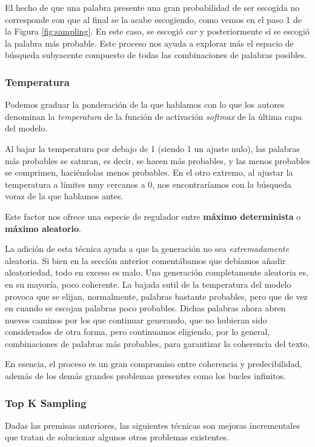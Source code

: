 El hecho de que una palabra presente una gran probabilidad de ser escogida no corresponde con que al final se la acabe escogiendo, como vemos en el paso 1 de la Figura \ref{fig:sampling}. En este caso, se escogió \textit{car} y posteriormente sí se escogió la palabra más probable. Este proceso nos ayuda a explorar más el espacio de búsqueda subyacente compuesto de todas las combinaciones de palabras posibles.

\subsubsection{Temperatura}
Podemos graduar la ponderación de la que hablamos con lo que los autores denominan la \textit{temperatura} de la función de activación \textit{softmax} de la última capa del modelo.

Al bajar la temperatura por debajo de 1 (siendo 1 un ajuste nulo), las palabras más probables se saturan, es decir, se hacen más probables, y las menos probables se comprimen, haciéndolas menos probables. En el otro extremo, al ajustar la temperatura a límites muy cercanos a 0, nos encontraríamos con la búsqueda voraz de la que hablamos antes.

Este factor nos ofrece una especie de regulador entre \textbf{máximo determinista} o \textbf{máximo aleatorio}.

La adición de esta técnica ayuda a que la generación no sea \textit{extremadamente} aleatoria. Si bien en la sección anterior comentábamos que debíamos añadir aleatoriedad, todo en exceso es malo. Una generación completamente aleatoria es, en su mayoría, poco coherente. La bajada sutil de la temperatura del modelo provoca que se elijan, normalmente, palabras bastante probables, pero que de vez en cuando se escojan palabras poco probables. Dichas palabras ahora abren nuevos caminos por los que continuar generando, que no hubieran sido considerados de otra forma, pero continuamos eligiendo, por lo general, combinaciones de palabras más probables, para garantizar la coherencia del texto.

En esencia, el proceso es un gran compromiso entre coherencia y predecibilidad, además de los demás grandes problemas presentes como los bucles infinitos.

\subsubsection{Top K Sampling}

Dadas las premisas anteriores, las siguientes técnicas son mejoras incrementales que tratan de solucionar algunos otros problemas existentes.

